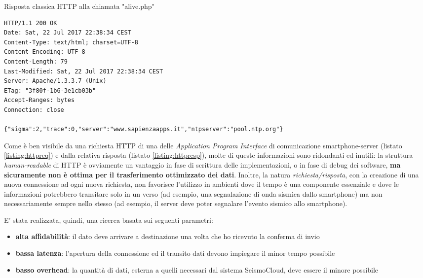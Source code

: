 \documentclass[a4paper,10pt]{memoir}
\begin{document}
\begin{listing}[h]
\caption{Risposta classica HTTP alla chiamata "alive.php"}
\label{listing:httpresp}
\begin{verbatim}
HTTP/1.1 200 OK
Date: Sat, 22 Jul 2017 22:38:34 CEST
Content-Type: text/html; charset=UTF-8
Content-Encoding: UTF-8
Content-Length: 79
Last-Modified: Sat, 22 Jul 2017 22:38:34 CEST
Server: Apache/1.3.3.7 (Unix)
ETag: "3f80f-1b6-3e1cb03b"
Accept-Ranges: bytes
Connection: close

{"sigma":2,"trace":0,"server":"www.sapienzaapps.it","ntpserver":"pool.ntp.org"}
\end{verbatim}
\end{listing}

Come è ben visibile da una richiesta HTTP di una delle \textit{Application Program Interface} di comunicazione smartphone-server (listato \ref{listing:httpreq}) e dalla relativa risposta (listato \ref{listing:httpresp}), molte di queste informazioni sono ridondanti ed inutili: la struttura \textit{human-readable} di HTTP è ovviamente un vantaggio in fase di scrittura delle implementazioni, o in fase di debug dei software, \textbf{ma sicuramente non è ottima per il trasferimento ottimizzato dei dati}. Inoltre, la natura \textit{richiesta/risposta}, con la creazione di una nuova connessione ad ogni nuova richiesta, non favorisce l'utilizzo in ambienti dove il tempo è una componente essenziale e dove le informazioni potrebbero transitare solo in un verso (ad esempio, una segnalazione di onda sismica dallo smartphone) ma non necessariamente sempre nello stesso (ad esempio, il server deve poter segnalare l'evento sismico allo smartphone).

\pagebreak 

E' stata realizzata, quindi, una ricerca basata sui seguenti parametri:
\begin{itemize}
\item \textbf{alta affidabilità}: il dato deve arrivare a destinazione una volta che ho ricevuto la conferma di invio
\item \textbf{bassa latenza}: l'apertura della connessione ed il transito dati devono impiegare il minor tempo possibile
\item \textbf{basso overhead}: la quantità di dati, esterna a quelli necessari dal sistema SeismoCloud, deve essere il minore possibile
\end{itemize}
\end{document}
